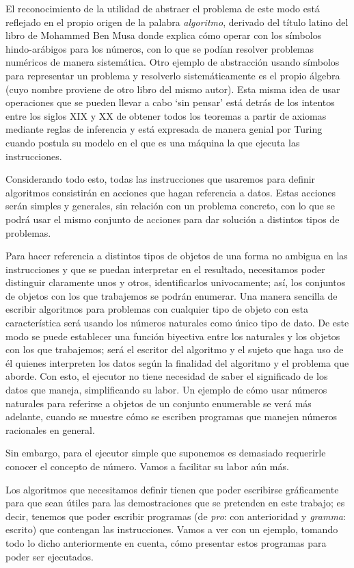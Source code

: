 El reconocimiento de la utilidad de abstraer el problema de este modo está reflejado en el propio
origen de la palabra {\it algoritmo}, derivado del título latino del libro de Mohammed Ben Musa
donde explica cómo operar con los símbolos hindo-arábigos para los números, con lo que se podían
resolver problemas numéricos de manera sistemática. Otro ejemplo de abstracción usando símbolos para
representar un problema y resolverlo sistemáticamente es el propio álgebra (cuyo nombre proviene de
otro libro del mismo autor). Esta misma idea de usar operaciones que se pueden llevar a cabo ‘sin
pensar’ está detrás de los intentos entre los siglos XIX y XX de obtener todos los teoremas a partir
de axiomas mediante reglas de inferencia y está expresada de manera genial por Turing cuando postula
su modelo en el que es una máquina la que ejecuta las instrucciones.

Considerando todo esto, todas las instrucciones que usaremos para definir algoritmos consistirán en
acciones que hagan referencia a datos. Estas acciones serán simples y generales, sin relación con un
problema concreto, con lo que se podrá usar el mismo conjunto de acciones para dar solución a
distintos tipos de problemas.

Para hacer referencia a distintos tipos de objetos de una forma no ambigua en las instrucciones y
que se puedan interpretar en el resultado, necesitamos poder distinguir claramente unos y otros,
identificarlos univocamente; así, los conjuntos de objetos con los que trabajemos se podrán
enumerar. Una manera sencilla de escribir algoritmos para problemas con cualquier tipo de objeto con
esta característica será usando los números naturales como único tipo de dato. De este modo se puede
establecer una función biyectiva entre los naturales y los objetos con los que trabajemos; será el
escritor del algoritmo y el sujeto que haga uso de él quienes interpreten los datos según la
finalidad del algoritmo y el problema que aborde. Con esto, el ejecutor no tiene necesidad de saber
el significado de los datos que maneja, simplificando su labor. Un ejemplo de cómo usar números
naturales para referirse a objetos de un conjunto enumerable se verá más adelante, cuando se muestre
cómo se escriben programas que manejen números racionales en general.

Sin embargo, para el ejecutor simple que suponemos es demasiado requerirle conocer el concepto de
número. Vamos a facilitar su labor aún más.

Los algoritmos que necesitamos definir tienen que poder escribirse gráficamente para que sean útiles
para las demostraciones que se pretenden en este trabajo; es decir, tenemos que poder escribir
programas (de {\it pro}: con anterioridad y {\it gramma}: escrito) que contengan las
instrucciones. Vamos a ver con un ejemplo, tomando todo lo dicho anteriormente en cuenta, cómo
presentar estos programas para poder ser ejecutados.

